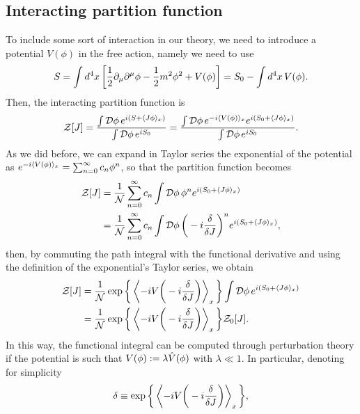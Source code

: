 \subsection{Interacting partition function}
To include some sort of interaction in our theory, we need to introduce a potential $V(\phi)$ in the free action, namely we need to use 
\begin{equation}
    S = \int d^4x\,\bigg[\frac{1}{2}\partial_\mu\partial^\mu\phi - \frac{1}{2}m^2\phi^2 + V(\phi)\bigg] = S_0 - \int d^4x\,V(\phi).
\end{equation}
Then, the interacting partition function is 
\begin{equation}
    \mathcal{Z}[J] = \frac{\int \mathcal{D}\phi\,e^{i(S + \langle J\phi \rangle_x)}}{\int \mathcal{D}\phi\,e^{iS_0}} = \frac{\int \mathcal{D}\phi\,e^{-i\langle V(\phi) \rangle_x}e^{i(S_0 + \langle J\phi \rangle_x)}}{\int \mathcal{D}\phi\,e^{iS_0}}.
\end{equation}
As we did before, we can expand in Taylor series the exponential of the potential as $e^{-i\langle V(\phi) \rangle_x} = \sum_{n=0}^\infty c_n\phi^n$, so that the partition function becomes 
\begin{equation}
    \begin{split}
        \mathcal{Z}[J] &= \frac{1}{\mathcal{N}}\sum_{n=0}^\infty c_n\int \mathcal{D}\phi\,\phi^n e^{i(S_0 + \langle J\phi \rangle_x)} \\ &= \frac{1}{\mathcal{N}}\sum_{n=0}^\infty c_n\int \mathcal{D}\phi\,\bigg(-i\frac{\delta}{\delta J}\bigg)^ne^{i(S_0 + \langle J\phi \rangle_x)},
    \end{split}
\end{equation}
then, by commuting the path integral with the functional derivative and using the definition of the exponential's Taylor series, we obtain 
\begin{equation}
    \begin{split}
        \mathcal{Z}[J] &= \frac{1}{\mathcal{N}}\exp{\bigg\{\left\langle -iV\bigg(-i\frac{\delta}{\delta J}\bigg) \right\rangle_x\bigg\}}\int \mathcal{D}\phi\, e^{i(S_0 + \langle J\phi \rangle_x)} \\
        &= \frac{1}{\mathcal{N}}\exp{\bigg\{\left\langle -iV\bigg(-i\frac{\delta}{\delta J}\bigg) \right\rangle_x\bigg\}}\mathcal{Z}_0[J].
    \end{split}
\end{equation}
In this way, the functional integral can be computed through perturbation theory if the potential is such that $V(\phi) := \lambda\hat{V}(\phi)$ with $\lambda \ll 1$. In particular, denoting for simplicity 
\begin{equation}
    \delta \equiv \exp{\bigg\{\left\langle -iV\bigg(-i\frac{\delta}{\delta J}\bigg) \right\rangle_x\bigg\}},
\end{equation}
